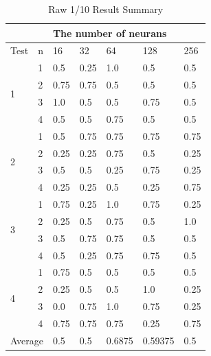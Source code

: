 \documentclass[draft,dvipsnames]{drexel-thesis}
\begin{document}
\begin{thesis}
\begin{table}[H]
\centering
\begin{tabular}{|l|l|l|l|l|l|l|}
\hline
                       &      & \multicolumn{5}{l|}{The number of neurans} \\ \hline
Test                   & n    & 16    & 32    & 64      & 128      & 256   \\ \hline
\multirow{4}{*}{1}     & 1    & 0.5   & 0.25  & 1.0     & 0.5      & 0.5   \\ \cline{2-7} 
                       & 2    & 0.75  & 0.75  & 0.5     & 0.5      & 0.5   \\ \cline{2-7} 
                       & 3    & 1.0   & 0.5   & 0.5     & 0.75     & 0.5   \\ \cline{2-7} 
                       & 4    & 0.5   & 0.5   & 0.75    & 0.5      & 0.5   \\ \hline
\multirow{4}{*}{2}     & 1    & 0.5   & 0.75  & 0.75    & 0.75     & 0.75  \\ \cline{2-7} 
                       & 2    & 0.25  & 0.25  & 0.75    & 0.5      & 0.25  \\ \cline{2-7} 
                       & 3    & 0.5   & 0.5   & 0.25    & 0.75     & 0.25  \\ \cline{2-7} 
                       & 4    & 0.25  & 0.25  & 0.5     & 0.25     & 0.75  \\ \hline
\multirow{4}{*}{3}     & 1    & 0.75  & 0.25  & 1.0     & 0.75     & 0.25  \\ \cline{2-7} 
                       & 2    & 0.25  & 0.5   & 0.75    & 0.5      & 1.0   \\ \cline{2-7} 
                       & 3    & 0.5   & 0.75  & 0.75    & 0.5      & 0.5   \\ \cline{2-7} 
                       & 4    & 0.5   & 0.25  & 0.75    & 0.75     & 0.5   \\ \hline
\multirow{4}{*}{4}     & 1    & 0.75  & 0.5   & 0.5     & 0.5      & 0.5   \\ \cline{2-7} 
                       & 2    & 0.25  & 0.5   & 0.5     & 1.0      & 0.25  \\ \cline{2-7} 
                       & 3    & 0.0   & 0.75  & 1.0     & 0.75     & 0.25  \\ \cline{2-7} 
                       & 4    & 0.75  & 0.75  & 0.75    & 0.25     & 0.75  \\ \hline
\multicolumn{2}{|l|}{Average} & 0.5   & 0.5   & 0.6875  & 0.59375  & 0.5   \\ \hline
\end{tabular}
\caption{Raw 1/10 Result Summary}
\label{Raw 1/10 Result Summary}
\end{table}



\end{thesis}
\end{document}
